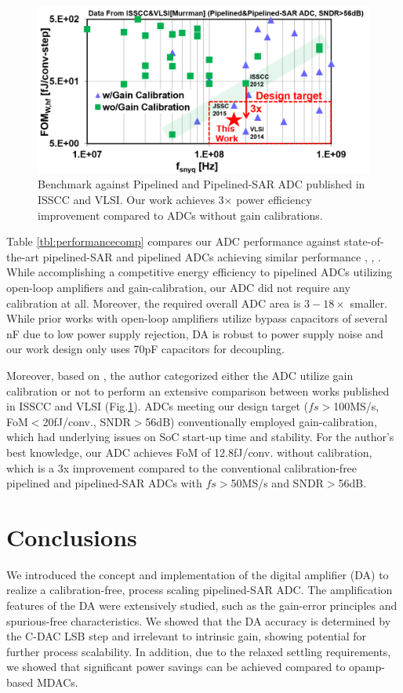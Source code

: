 \begin{figure}[!]
\centering
  \includegraphics[width=1\textwidth]{figure/chap2/bench.png}
  \caption{Benchmark against Pipelined and Pipelined-SAR ADC published in ISSCC and VLSI. Our work achieves 3$\times$ power efficiency improvement compared to ADCs without gain calibrations.}
  \label{fig-bench}
\end{figure}
Table \ref{tbl:performancecomp} compares our ADC performance against state-of-the-art pipelined-SAR and pipelined ADCs achieving similar performance \cite{verbruggen201470}, \cite{zhou201512}, \cite{chai20125}. While accomplishing a competitive energy efficiency to pipelined ADCs utilizing open-loop amplifiers and gain-calibration, our ADC did not require any calibration at all. Moreover, the required overall ADC area is $3-18\times$ smaller. While prior works with open-loop amplifiers utilize bypass capacitors of several nF due to low power supply rejection, DA is robust to power supply noise and our work design only uses 70pF capacitors for decoupling. 

Moreover, based on \cite{MurmanADC}, the author categorized either the ADC utilize gain calibration or not to perform an extensive comparison between works published in ISSCC and VLSI (Fig.\ref{fig-bench}). ADCs meeting our design target ($fs>$100MS/s, FoM$<$20fJ/conv., SNDR$>$56dB) conventionally employed gain-calibration, which had underlying issues on SoC start-up time and stability. For the author's best knowledge, our ADC achieves FoM of 12.8fJ/conv. without calibration, which is a 3x improvement compared to the conventional calibration-free pipelined and pipelined-SAR ADCs with $fs>$50MS/s and SNDR$>$56dB. 

\section{Conclusions}
We introduced the concept and implementation of the digital amplifier (DA) to realize a calibration-free, process scaling pipelined-SAR ADC. 
The amplification features of the DA were extensively studied, such as the gain-error principles and spurious-free characteristics. We showed that the DA accuracy is determined by the C-DAC LSB step and irrelevant to intrinsic gain, showing potential for further process scalability. In addition, due to the relaxed settling requirements, we showed that significant power savings can be achieved compared to opamp-based MDACs.


